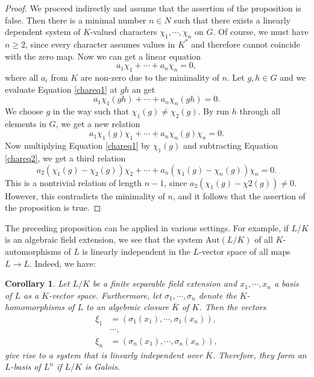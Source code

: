 \documentclass[12pt]{report}
\newtheorem{corollary}[theorem]{Corollary}
\theoremstyle{definition}
\newcommand{\Aut}{\text{Aut}}
\begin{document}
\begin{proof}
	We proceed indirectly and assume that the assertion of the proposition is false. Then there is a minimal number $n \in N$ such that there exists a linearly dependent system of $K$-valued characters $\chi_1, \cdots , \chi_n$ on $G$. Of course, we must have $n \geq 2$, since every character assumes values in $K^*$ and therefore cannot coincide with the zero map. Now we can get a linear equation
	\begin{equation}\label{chareq1}
		a_1\chi_1+\cdots + a_n\chi_n = 0,
	\end{equation}
	where all $a_i$ from $K$ are non-zero due to the minimality of $n$. Let $g,h\in G$ and  we evaluate Equation \ref{chareq1} at $gh$ an get
	\begin{equation*}
		a_1\chi_1(gh)+\cdots + a_n\chi_n(gh) = 0.
	\end{equation*}
	We choose $g$ in the way such that $\chi_1(g)\not=\chi_2(g)$. By run $h$ through all elements in $G$, we get a new relation
	\begin{equation}\label{chareq2}
		a_1\chi_1(g)\chi_1+\cdots + a_n\chi_n(g)\chi_n = 0.
	\end{equation}
	Now multiplying Equation \ref{chareq1} by $\chi_1(g)$ and subtracting Equation \ref{chareq2}, we get a third relation
	\begin{equation*}
		a_2(\chi_1(g)-\chi_2(g))\chi_2 +\cdots + a_n(\chi_1(g)-\chi_n(g))\chi_n = 0.
	\end{equation*}
	This is a nontrivial relation of length $n-1$, since $a_2(\chi_1(g)-\chi2(g)) \not= 0$. However, this contradicts the minimality of $n$, and it follows that the assertion of the proposition is true.
\end{proof}


The preceding proposition can be applied in various settings. For example, if $L/K$ is an algebraic field extension, we see that the system $\Aut(L/K)$ of all $K$-automorphisms of $L$ is linearly independent in the $L$-vector space of all maps $L \to L$. Indeed, we have:

\begin{corollary}\label{charcor}
	Let $L/K$ be a finite separable field extension and $x_1, \cdots , x_n$ a basis of $L$ as a $K$-vector space. Furthermore, let $\sigma_1, \cdots , \sigma_n$ denote the $K$-homomorphisms of $L$ to an algebraic closure $\overline{K}$ of $K$. Then the vectors
	\begin{align*}
		\xi_1 & = (\sigma_1(x_1),\cdots,\sigma_1(x_n)), \\
		      & \cdots,                                 \\
		\xi_n & = (\sigma_n(x_1),\cdots,\sigma_n(x_n)),
	\end{align*}
	give rise to a system that is linearly independent over $\overline{K}$. Therefore, they form an $L$-basis of $L^n$ if $L/K$ is Galois.
\end{corollary}
\end{document}
